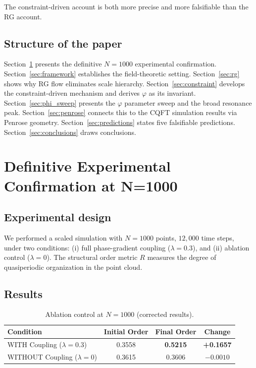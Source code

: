 \documentclass[11pt,a4paper]{article}
\theoremstyle{plain}
\theoremstyle{definition}
\newcommand{\phiGolden}{\varphi}
\begin{document}
The constraint-driven account is both more precise and more falsifiable
than the RG account.

\subsection{Structure of the paper}

Section~\ref{sec:experiment} presents the definitive $N=1000$ experimental
confirmation. Section~\ref{sec:framework} establishes the field-theoretic
setting. Section~\ref{sec:rg} shows why RG flow eliminates scale hierarchy.
Section~\ref{sec:constraint} develops the constraint-driven mechanism
and derives $\phiGolden$ as its invariant.
Section~\ref{sec:phi_sweep} presents the $\phiGolden$ parameter sweep
and the broad resonance peak. Section~\ref{sec:penrose} connects this
to the CQFT simulation results via Penrose geometry.
Section~\ref{sec:predictions} states five falsifiable predictions.
Section~\ref{sec:conclusions} draws conclusions.

\section{Definitive Experimental Confirmation at N=1000}
\label{sec:experiment}

\subsection{Experimental design}

We performed a scaled simulation with $N = 1000$ points, $12{,}000$ time steps,
under two conditions: (i) full phase-gradient coupling ($\lambda = 0.3$), and
(ii) ablation control ($\lambda = 0$). The structural order metric $R$ measures
the degree of quasiperiodic organization in the point cloud.

\subsection{Results}

\begin{table}[h]
\centering
\caption{Ablation control at $N=1000$ (corrected results).}
\label{tab:ablation1000}
\begin{tabular}{lccc}
\toprule
\textbf{Condition} & \textbf{Initial Order} & \textbf{Final Order} &
  \textbf{Change} \\
\midrule
WITH Coupling ($\lambda = 0.3$) & 0.3558 & \textbf{0.5215} & \textbf{+0.1657} \\
WITHOUT Coupling ($\lambda = 0$) & 0.3615 & 0.3606 & $-0.0010$ \\
\bottomrule
\end{tabular}
\end{table}
\end{document}
